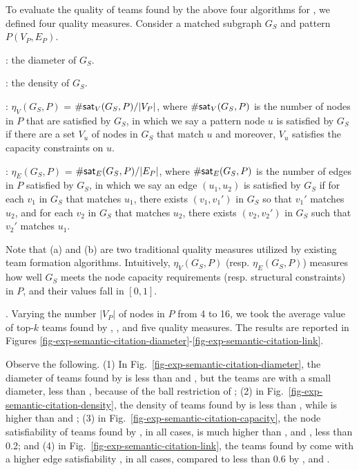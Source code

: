 To evaluate the quality of teams found by the above four algorithms for \teamF, we defined four quality measures. 
Consider a matched subgraph $G_S$ and pattern $P(V_P, E_P)$.

: the diameter of $G_S$.

: the density of $G_S$.

: $\eta_V(G_S, P)$ = $\#{\mathsf{sat}}_V(G_S, P) / |V_P|$, where $\#{\mathsf{sat}}_V(G_S, P)$ is the number of nodes in $P$ that are satisfied by $G_S$, in which we say a pattern node $u$ is satisfied by $G_S$ if there are a set $V_u$ of nodes in $G_S$ that match $u$ and moreover, $V_u$ satisfies the capacity constraints on $u$.

: $\eta_E(G_S, P)$ = $\#{\mathsf{sat}}_E(G_S,P)/|E_P|$, where $\#{\mathsf{sat}}_E(G_S,P)$ is the number of edges in $P$ satisfied by $G_S$, in which we say an edge $(u_1, u_2)$ is satisfied by $G_S$ if for each $v_1$ in $G_S$ that matches $u_1$,
there exists $(v_1, v_1')$ in $G_S$ so that $v_1'$ matches $u_2$, and for each  $v_2$ in $G_S$ that matches $u_2$, there exists $(v_2, v_2')$ in $G_S$ such that $v_2'$ matches $u_1$.


Note that (a) and (b) are two traditional quality measures utilized by existing team formation algorithms.
Intuitively, $\eta_V(G_S, P)$ (resp. $\eta_E(G_S,P)$) measures how well $G_S$ meets the node capacity requirements (resp. structural constraints) in $P$, and their values fall in $[0, 1]$.



. Varying the number $|V_{P}|$ of
nodes in $P$ from 4 to 16, we took the average value of top-$k$ teams found by  \optgrouprec, \mindia, \minsumdis and \denalk \wrt five quality measures.
The results are reported in Figures \ref{fig-exp-semantic-citation-diameter}-\ref{fig-exp-semantic-citation-link}.

Observe the following.
%
(1) In Fig.~\ref{fig-exp-semantic-citation-diameter}, the diameter of teams found by \optgrouprec is less than \mindia and \minsumdis, but the teams are with a small diameter, \eg less than \denalk, because of the ball restriction of \optgrouprec;
(2) in Fig.~\ref{fig-exp-semantic-citation-density}, the density of teams found by \optgrouprec is less than \denalk, while is higher than \mindia and \minsumdis;
(3) in Fig.~\ref{fig-exp-semantic-citation-capacity}, the node satisfiability of teams found by \optgrouprec,  in all cases, is much higher than \mindia, \minsumdis and \denalk, \ie less than 0.2; and
(4) in Fig.~\ref{fig-exp-semantic-citation-link}, the teams found by \optgrouprec come with a higher edge satisfiability ,  in all cases, compared to less than 0.6 by \mindia, \minsumdis and \denalk.


